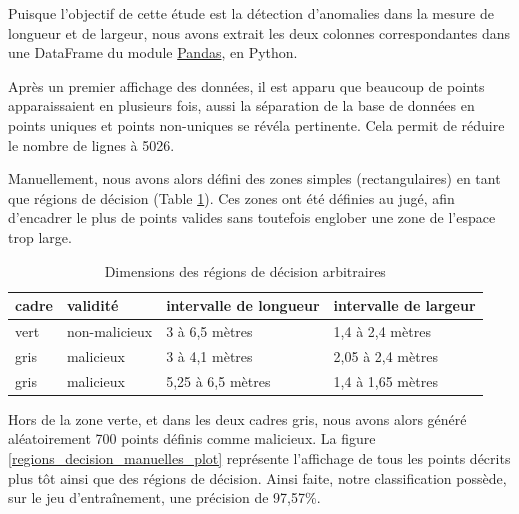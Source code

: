 \documentclass[a4paper]{report}
\begin{document}
Puisque l'objectif de cette étude est la détection d'anomalies dans la mesure de longueur et de largeur, nous avons extrait les deux colonnes correspondantes dans une DataFrame du module \href{http://pandas.pydata.org}{Pandas}, en Python.

Après un premier affichage des données, il est apparu que beaucoup de points apparaissaient en plusieurs fois, aussi la séparation de la base de données en points uniques et points non-uniques se révéla pertinente. Cela permit de réduire le nombre de lignes à 5026.

Manuellement, nous avons alors défini des zones simples (rectangulaires) en tant que régions de décision (Table \ref{regions_decision_manuelles_valeurs}). Ces zones ont été définies au jugé, afin d'encadrer le plus de points valides sans toutefois englober une zone de l'espace trop large.

\begin{table}[h]
\centering
\begin{tabular}{llll}
cadre & validité & intervalle de longueur & intervalle de largeur \\
\hline
vert & non-malicieux & 3 à 6,5 mètres & 1,4 à 2,4 mètres \\
gris & malicieux & 3 à 4,1 mètres & 2,05 à 2,4 mètres \\
gris & malicieux & 5,25 à 6,5 mètres & 1,4 à 1,65 mètres \\
\end{tabular}
\caption{Dimensions des régions de décision arbitraires\label{regions_decision_manuelles_valeurs}}
\end{table}


Hors de la zone verte, et dans les deux cadres gris, nous avons alors généré aléatoirement 700 points définis comme malicieux. La figure \ref{regions_decision_manuelles_plot} représente l'affichage de tous les points décrits plus tôt ainsi que des régions de décision. Ainsi faite, notre classification possède, sur le jeu d'entraînement, une précision de 97,57\%.
\end{document}
